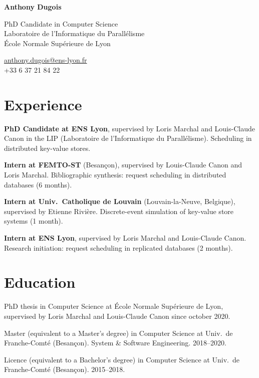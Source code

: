 \documentclass[12pt]{article}
\makeatletter
\newcommand{\myname}{Anthony Dugois}
\newcommand{\mymail}{anthony.dugois@ens-lyon.fr}
\newcommand{\myphone}{+33 6 37 21 84 22}
\newcommand{\myaffiliation}{PhD Candidate in Computer Science\\
  Laboratoire de l'Informatique du Parallélisme\\
  École Normale Supérieure de Lyon}
\newcommand{\mytitle}{%
  \raggedright

  {\normalfont\bfseries\huge\myname}
  
  \vspace{10pt}

  \begin{minipage}[t]{0.65\textwidth}
    \myaffiliation
  \end{minipage}%
  \begin{minipage}[t]{0.35\textwidth}
    \flushright
    \href{mailto:\mymail}{\mymail} \\
    \myphone
  \end{minipage}
}
\newcounter{cvitems}
\newcommand{\cvitem}[2]{\item[#1] #2}
\makeatother
\begin{document}
\mytitle

\section*{Experience}

\begin{cvitems}
  \cvitem{2020--}{\textbf{PhD Candidate at ENS Lyon}, supervised by Loris Marchal and Louis-Claude
  Canon in the LIP (Laboratoire de l'Informatique du Parallélisme).  
  Scheduling in distributed key-value stores.}

  \cvitem{2020}{\textbf{Intern at FEMTO-ST} (Besançon), supervised by Louis-Claude Canon and Loris
  Marchal.  
  Bibliographic synthesis: request scheduling in distributed databases (6 months).}

  \cvitem{2019}{\textbf{Intern at Univ.\ Catholique de Louvain}
  (Louvain-la-Neuve, Belgique), supervised by Etienne Rivière.  
  Discrete-event simulation of key-value store systems (1 month).}

  \cvitem{2019}{\textbf{Intern at ENS Lyon}, supervised by Loris Marchal and Louis-Claude Canon.  
  Research initiation: request scheduling in replicated databases (2 months).}


\end{cvitems}

\section*{Education}

\begin{cvitems}
  \cvitem{\bfseries PhD}{PhD thesis in Computer Science at École Normale Supérieure de Lyon,
  supervised by Loris Marchal and Louis-Claude Canon since october 2020.}

  \cvitem{\bfseries Master}{Master (equivalent to a Master's degree) in Computer Science at Univ.\
  de Franche-Comté (Besançon).  
  System \& Software Engineering.  
  2018--2020.}

  \cvitem{\bfseries Licence}{Licence (equivalent to a Bachelor's degree) in Computer Science at
  Univ.\ de Franche-Comté (Besançon).  
  2015--2018.}
\end{cvitems}
\end{document}
